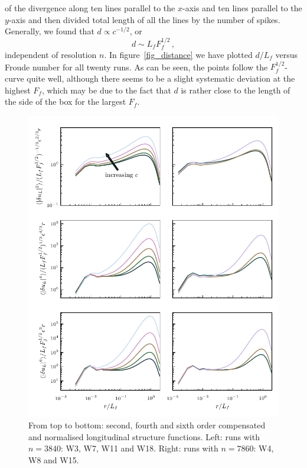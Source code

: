 \documentclass{jfm}
\begin{document}
of the divergence along ten lines parallel to the $ x $-axis and ten lines
parallel to the $ y $-axis and then divided total length of all the lines by
the number of spikes. Generally, we found that $ d \propto c^{-1/2} $, or
\begin{equation} \label{MeanDistance}
d \sim L_f F_f ^{1/2} \, ,
\end{equation}
independent of resolution $ n $. In figure~\ref{fig_distance} we have plotted
$ d/L_f $ versus Froude number for all twenty runs. As can be seen, the points
follow the $ F_f^{1/2} $-curve quite well, although there seems to be a slight
systematic deviation at the highest $ F_f $, which may be due to the fact that
$ d $ is rather close to the length of the side of the box for the largest $
F_f $. 

\begin{figure}
\centerline{
\includegraphics[width=5.0in]{../Pyfig/fig_struct_order_246}}
\caption{From top to bottom: second, fourth and sixth order compensated and
normalised longitudinal structure functions. Left: runs with $ n=3840 $: W3,
W7, W11 and W18. Right: runs with $ n = 7860 $: W4, W8 and W15. }
\label{fig_StrucFunc}
\end{figure}
\end{document}
